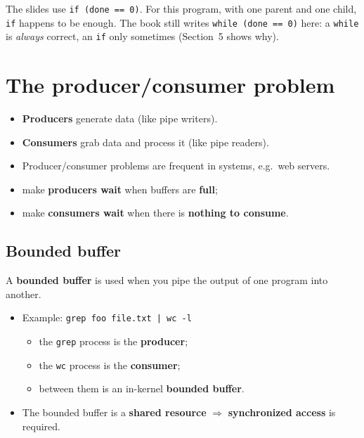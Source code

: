 \documentclass[11pt,a4paper]{article}
\begin{document}
The slides use \texttt{if (done == 0)}. For this program, with one parent
and one child, \texttt{if} happens to be enough. The book still writes
\texttt{while (done == 0)} here: a \texttt{while} is \emph{always} correct,
an \texttt{if} only sometimes (Section~5 shows why).

\section{The producer/consumer problem}

\begin{itemize}
  \item \textbf{Producers} generate data (like pipe writers).
  \item \textbf{Consumers} grab data and process it (like pipe readers).
  \item Producer/consumer problems are frequent in systems, e.g.\ web
        servers.
\end{itemize}

\begin{keybox}
\begin{itemize}
  \item make \textbf{producers wait} when buffers are \textbf{full};
  \item make \textbf{consumers wait} when there is \textbf{nothing to
        consume}.
\end{itemize}
\end{keybox}

\subsection{Bounded buffer}

A \textbf{bounded buffer} is used when you pipe the output of one program
into another.
\begin{itemize}
  \item Example: \texttt{grep foo file.txt | wc -l}
    \begin{itemize}
      \item the \texttt{grep} process is the \textbf{producer};
      \item the \texttt{wc} process is the \textbf{consumer};
      \item between them is an in-kernel \textbf{bounded buffer}.
    \end{itemize}
  \item The bounded buffer is a \textbf{shared resource} \(\Rightarrow\)
        \textbf{synchronized access} is required.
\end{itemize}
\end{document}
